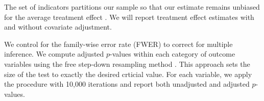\documentclass[12pt]{article}
\begin{document}
		The set of indicators partitions our sample so that our estimate remains unbiased for the average treatment effect . We will report treatment effect estimates with and without covariate adjustment.


		We control for the family-wise error rate (FWER) to correct for multiple inference. We compute adjusted $p$-values within each category of outcome variables using the free step-down resampling method . This approach sets the size of the test to exactly the desired crticial value. For each variable, we apply the procedure with 10,000 iterations and report both unadjusted and adjusted $p$-values.
\end{document}
